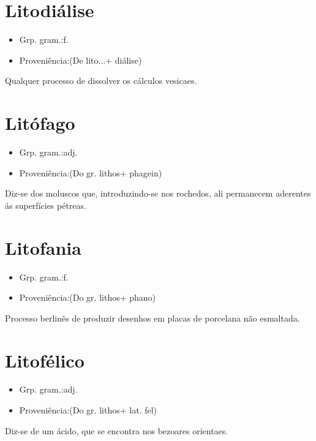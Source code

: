 \section{Litodiálise}
\begin{itemize}
\item {Grp. gram.:f.}
\end{itemize}
\begin{itemize}
\item {Proveniência:(De \textunderscore lito...\textunderscore  + \textunderscore diálise\textunderscore )}
\end{itemize}
Qualquer processo de dissolver os cálculos vesicaes.
\section{Litófago}
\begin{itemize}
\item {Grp. gram.:adj.}
\end{itemize}
\begin{itemize}
\item {Proveniência:(Do gr. \textunderscore lithos\textunderscore  + \textunderscore phagein\textunderscore )}
\end{itemize}
Diz-se dos moluscos que, introduzindo-se nos rochedos, ali permanecem aderentes ás superfícies pétreas.
\section{Litofania}
\begin{itemize}
\item {Grp. gram.:f.}
\end{itemize}
\begin{itemize}
\item {Proveniência:(Do gr. \textunderscore lithos\textunderscore  + \textunderscore phano\textunderscore )}
\end{itemize}
Processo berlinês de produzir desenhos em placas de porcelana não esmaltada.
\section{Litofélico}
\begin{itemize}
\item {Grp. gram.:adj.}
\end{itemize}
\begin{itemize}
\item {Proveniência:(Do gr. \textunderscore lithos\textunderscore  + lat. \textunderscore fel\textunderscore )}
\end{itemize}
Diz-se de um ácido, que se encontra nos bezoares orientaes.

